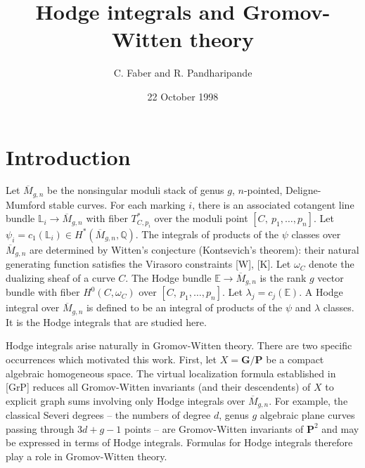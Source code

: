 \documentclass[11 pt]{amsart}
\newcommand{\proj}{\mathbf P}
\newcommand{\rarr}{\rightarrow}
\newcommand{\Q}{\mathbb{Q}}
\newcommand{\mgn}{\overline{M}_{g,n}}
\newcommand{\LL}{\mathbb{L}}
\newcommand{\hodge}{\mathbb{E}}
\begin{document}
\title{Hodge integrals and Gromov-Witten theory}
\author{C. Faber and R. Pandharipande}
\date{22 October 1998}
\maketitle

\pagestyle{plain}
\setcounter{section}{-1}
\section{\bf{Introduction}}
Let $\mgn$ be the nonsingular moduli stack of genus $g$, $n$-pointed,
Deligne-Mumford stable curves. For each marking $i$,
there is an associated cotangent line bundle $\LL_i\rarr \mgn$ with
fiber $T^*_{C,p_i}$ over the moduli point $[C, \ p_1, \ldots, p_n]$.
Let $\psi_i=c_1(\LL_i) \in H^*(\mgn, \Q)$. The integrals
of
products of the $\psi$ classes over $\mgn$ 
are determined by Witten's conjecture
(Kontsevich's theorem): their natural generating function
satisfies the Virasoro constraints [W], [K]. Let 
$\omega_C$ denote the dualizing sheaf of a curve $C$.
The Hodge bundle $\hodge\rarr \mgn$ is the rank $g$ vector bundle
with fiber $H^0(C, \omega_C)$ over
$[C, \ p_1, \ldots,p_n]$. Let $\lambda_j= c_j(\hodge).$
A Hodge integral over $\mgn$ is defined to be an integral
of products of the $\psi$ and $\lambda$
classes. It is the Hodge integrals that are studied here. 


Hodge integrals arise naturally in
Gromov-Witten theory. There are two specific occurrences
which motivated this work.
First, let $X= \mathbf{G}/\mathbf{P}$ be
a compact algebraic homogeneous space. 
The virtual localization formula
established in [GrP] reduces all Gromov-Witten invariants (and
their descendents) of $X$ to  explicit graph sums involving only 
Hodge integrals over $\mgn$. For example, the classical Severi degrees
-- the numbers of degree $d$, genus $g$ algebraic plane
curves passing through $3d+g-1$ points -- are
Gromov-Witten invariants of $\proj^2$ and may be expressed
in terms of Hodge integrals. Formulas for 
Hodge integrals therefore play a role in
Gromov-Witten theory.
\end{document}
